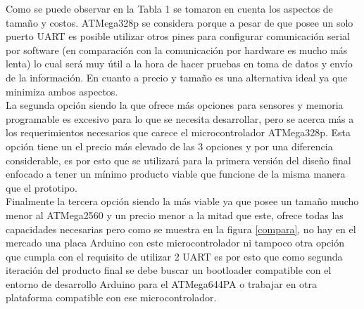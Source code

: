 Como se puede observar en la Tabla 1 se tomaron en cuenta los aspectos de tamaño y costos. ATMega328p se considera porque a pesar de que posee un solo puerto UART es posible utilizar otros pines para configurar comunicación serial por software (en comparación con la comunicación por hardware es mucho más lenta) lo cual será muy útil a la hora de hacer pruebas en toma de datos y envío de la información. En cuanto a precio y tamaño es una alternativa ideal ya que minimiza ambos aspectos. \\
La segunda opción siendo la que ofrece más opciones para sensores y memoria programable es excesivo para lo que se necesita desarrollar, pero se acerca más a los requerimientos necesarios que carece el microcontrolador ATMega328p. Esta opción tiene un el precio más elevado de las 3 opciones y por una diferencia considerable, es por esto que se utilizará para la primera versión del diseño final enfocado a tener un mínimo producto viable que funcione de la misma manera que el prototipo.\\
Finalmente la tercera opción siendo la más viable ya que posee un tamaño mucho menor al ATMega2560 y un precio menor a la mitad que este, ofrece todas las capacidades necesarias pero como se muestra en la figura \ref{compara}, no hay en el mercado una placa Arduino con este microcontrolador ni tampoco otra opción que cumpla con el requisito de utilizar 2 UART es por esto que como segunda iteración del producto final se debe buscar un bootloader compatible con el entorno de desarrollo Arduino para el ATMega644PA o trabajar en otra plataforma compatible con ese microcontrolador.


